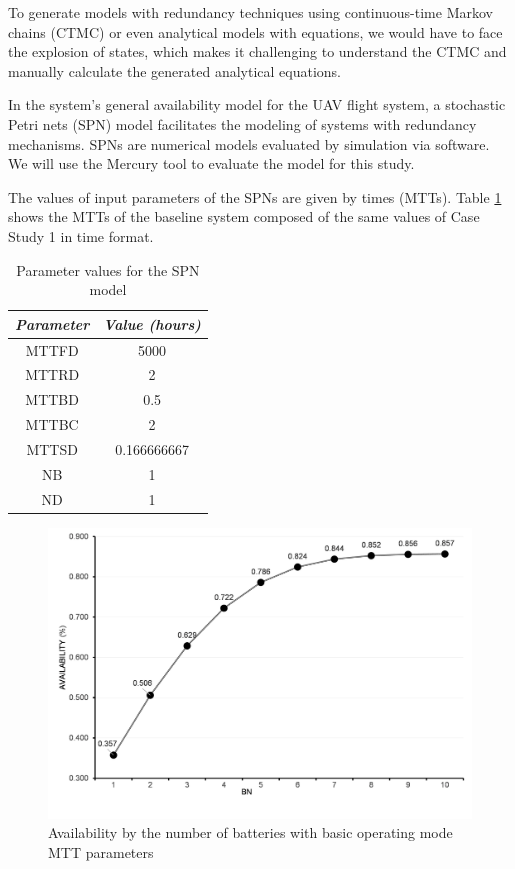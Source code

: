 \documentclass[conference]{IEEEtran}
\begin{document}
To generate models with redundancy techniques using continuous-time Markov chains (CTMC) or even analytical models with equations, we would have to face the explosion of states, which makes it challenging to understand the CTMC and manually calculate the generated analytical equations.

In the system's general availability model for the UAV flight system, a stochastic Petri nets (SPN) model facilitates the modeling of systems with redundancy mechanisms. SPNs are numerical models evaluated by simulation via software. We will use the Mercury tool to evaluate the \citep{maciel2017mercury} model for this study.

The values of input parameters of the SPNs are given by times (MTTs). Table \ref{tab:basic_spn_parameter_values} shows the MTTs of the baseline system composed of the same values of Case Study 1 in time format.


\begin{table}[htbp]
\caption{Parameter values for the SPN model}
\begin{center}
\begin{tabular}{|c|c|}
\hline
\textbf{\textit{Parameter}} & \textbf{\textit{Value (hours)}} \\
\hline
  MTTFD & 5000\\
 MTTRD & 2\\
 MTTBD & 0.5 \\ 
 MTTBC & 2 \\
 MTTSD & 0.166666667 \\
 NB & 1 \\
 ND & 1 \\
\hline
\end{tabular}
\label{tab:basic_spn_parameter_values}
\end{center}
\end{table}

\begin{figure}[htbp]
\centerline{\includegraphics[scale=0.45]{img/exps/SA_006.png}}
\caption{Availability by the number of batteries with basic operating mode MTT parameters}
\label{fig:basic_spn_sa_battery}
\end{figure}
\end{document}
